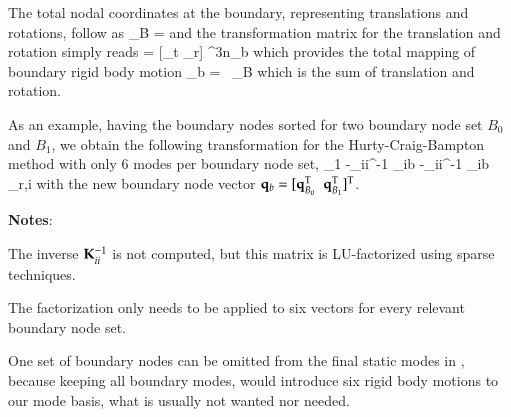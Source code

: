 The total nodal coordinates at the boundary, representing translations and rotations, follow as
\be
  \qv_{B} =  \eqComma
\ee
and the transformation matrix for the translation and rotation simply reads
\be
  \Tm = [\Tm_t \;\; \Tm_r] \in \Rcal^{3n_b } \eqComma
\ee
which provides the total mapping of boundary rigid body motion
\be
  \qv_{b} = \Tm \, \qv_{B} \eqComma
\ee 
which is the sum of translation and rotation.

As an example, having the boundary nodes sorted for two boundary node set $B_0$ and $B_1$, we obtain the following transformation for the Hurty-Craig-Bampton method with only 6 modes per boundary node set,
\be \label{theory:eigenmodes:HCBRBE2}
	 \approx {} {\Null}{\Tm_1}{\Null} 
	                          {-\Km_{ii}^{-1} \Km_{ib} }{-\Km_{ii}^{-1} \Km_{ib} }{\tPsi_{r,i}}   
	 \eqDot
\ee
with the new boundary node vector $\mathbf{q}_b = [\mathbf{q}_{B_0}^\mathrm{T} \;\; \mathbf{q}_{B_1}^\mathrm{T}]^\mathrm{T}$.

{\bf Notes}:
\bi
  \item The inverse $\mathbf{K}_{ii}^{-1} $ is not computed, but this matrix is LU-factorized using sparse techniques.
	\item The factorization only needs to be applied to six vectors for every relevant boundary node set.
	\item One set of boundary nodes can be omitted from the final static modes in , because keeping all boundary modes, would introduce six rigid body motions to our mode basis, what is usually not wanted nor needed.
\ei

